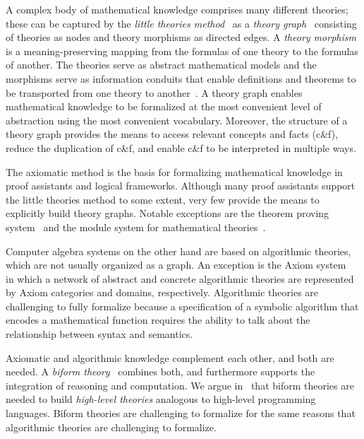 \documentclass[fleqn]{llncs}
\begin{document}
A complex body of mathematical knowledge comprises many different
theories; these can be captured by the \emph{little theories
  method}~\cite{FarmerEtAl92b} as a \emph{theory
  graph}~\cite{Kohlhase14} consisting of theories as nodes and theory
morphisms as directed edges.  A \emph{theory morphism} is a
meaning-preserving mapping from the formulas of one theory to the
formulas of another.  The theories serve as abstract mathematical
models and the morphisms serve as information conduits that enable
definitions and theorems to be transported from one theory to
another~\cite{BarwiseSeligman97}.  A theory graph enables mathematical
knowledge to be formalized at the most convenient level of abstraction
using the most convenient vocabulary.  Moreover, the structure of a
theory graph provides the means to access relevant concepts and facts
(c\&f), reduce the duplication of c\&f, and enable c\&f to be
interpreted in multiple ways.

The axiomatic method is the basis for formalizing mathematical
knowledge in proof assistants and logical frameworks.  Although many
proof assistants support the little theories method to some extent,
very few provide the means to explicitly build theory graphs.  Notable
exceptions are the {\imps} theorem proving system~\cite{FarmerEtAl93}
and the {\mmt} module system for mathematical
theories~\cite{RabeKohlhase13}.

Computer algebra systems on the other hand are based on
algorithmic theories, which are not usually
organized as a graph.  An exception is the
Axiom system~\cite{JenksSutor92} in which a
network of abstract and concrete algorithmic theories are represented
by Axiom categories and domains, respectively.  Algorithmic theories
are challenging to fully formalize because a specification of
a symbolic algorithm that encodes a mathematical function requires
the ability to talk about the relationship between syntax and
semantics.

Axiomatic and algorithmic knowledge complement each other, and both
are needed.  A \emph{biform
  theory}~\cite{CaretteFarmer08,Farmer07b,FarmerMohrenschildt03}
combines both, and furthermore supports the integration of reasoning
and computation.  We argue in~\cite{CaretteFarmer08} that biform
theories are needed to build \emph{high-level theories} analogous to
high-level programming languages.  Biform theories are challenging to
formalize for the same reasons that algorithmic theories are
challenging to formalize.
\end{document}
